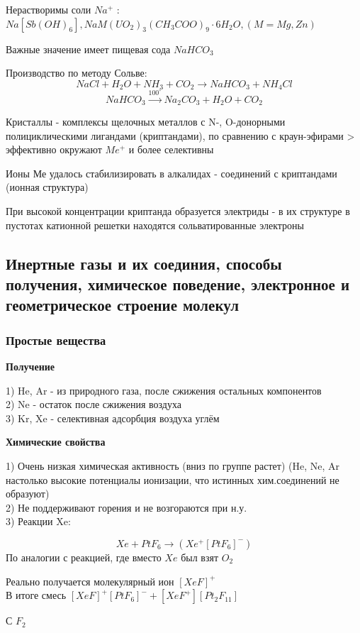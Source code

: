 \documentclass[14pt,a4paper]{scrartcl}
\begin{document}
Нерастворимы соли $Na^+$ : $Na[Sb(OH)_6], NaM(UO_2)_3(CH_3COO)_9\cdot 6H_2O, (M = Mg, Zn)$

Важные значение имеет пищевая сода $NaHCO_3$

Производство по методу Сольве:
$$NaCl + H_2O + NH_3 + CO_2 \rightarrow NaHCO_3 + NH_4Cl$$
$$NaHCO_3 \xrightarrow{100^{\circ}} Na_2CO_3 + H_2O + CO_2$$

Кристаллы - комплексы щелочных металлов с N-, O-донорными полициклическими лигандами (криптандами), по сравнению с краун-эфирами > эффективно окружают $Me^+$ и более селективны

Ионы Ме удалось стабилизировать в алкалидах - соединений с криптандами (ионная структура)

При высокой концентрации криптанда образуется электриды - в их структуре в пустотах катионной решетки находятся сольватированные электроны

\subsection{Инертные газы и их соединия, способы получения, химическое поведение, электронное и геометрическое строение молекул}

\subsubsection{Простые вещества}

\textbf{Получение}

1) He, Ar - из природного газа, после сжижения остальных компонентов\\
2) Ne - остаток после сжижения воздуха\\
3) Kr, Xe - селективная адсорбция воздуха углём

\textbf{Химические свойства}

1) Очень низкая химическая активность (вниз по группе растет) (He, Ne, Ar настолько высокие потенциалы ионизации, что истинных хим.соединений не образуют)\\
2) Не поддерживают горения и не возгораются при н.у.\\
3) Реакции Xe:

$$Xe + PtF_6 \rightarrow (Xe^+[PtF_6]^-)$$
По аналогии с реакцией, где вместо $Xe$ был взят $O_2$

Реально получается молекулярный ион $[XeF]^+$\\
В итоге смесь $[XeF]^+[PtF_6]^- + [XeF^+][Pt_2F_{11}]$

С $F_2$
\end{document}
